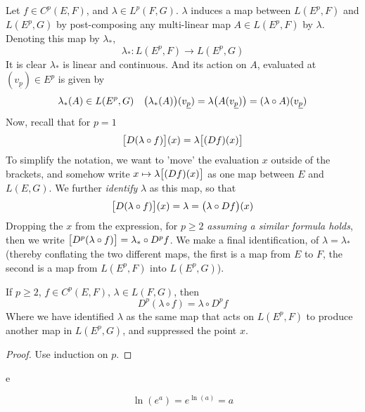 \documentclass[../main-manifolds.tex]{subfiles}
\begin{document}
\begin{note}
    Let $f\in C^p(E,F)$, and $\lambda\in L^p(F,G)$. $\lambda$ induces a map between $L(E^p, F)$ and $L(E^p, G)$ by post-composing any multi-linear map $A\in L(E^p, F)$ by $\lambda$. Denoting this map by $\lambda_*$, 
\[
\lambda_*: L(E^p, F)\to L(E^p, G)
\]
It is clear $\lambda_*$ is linear and continuous. And its action on $A$, evaluated at $(v_{\underline{p}})\in E^p$ is given by
\[
    \lambda_*(A)\in L(E^p, G)\quad \qty\big(\lambda_*(A))(v_{\underline{p}}) = \lambda\qty\big(A(v_{\underline{p}})) = (\lambda\circ A)(v_{\underline{p}})
\]
Now, recall that for $p=1$
\[
    \qty\big[D(\lambda\circ f)](x) = \lambda\qty\big[(Df)(x)]
\]
To simplify the notation, we want to 'move' the evaluation $x$ outside of the brackets, and somehow write $x\mapsto \lambda\qty\big[(Df)(x)]$ as one map between $E$ and $L(E,G)$. We further \emph{identify} $\lambda$ as this map, so that
\[
    \qty\big[D(\lambda\circ f)](x) = \lambda  = \qty\big(\lambda \circ Df)(x)
\]
Dropping the $x$ from the expression, for $p\geq 2$ \emph{assuming a similar formula holds}, then we write $\qty\big[D^p(\lambda\circ f)] = \lambda_*\circ D^pf$. We make a final identification, of $\lambda = \lambda_*$ (thereby conflating the two different maps, the first is a map from $E$ to $F$, the second is a map from $L(E^p, F)$ into $L(E^p, G)$).
\end{note}

\begin{wts}
    If $p\geq 2$, $f\in C^p(E,F)$, $\lambda\in L(F,G)$, then
    \[
        D^p(\lambda\circ f) = \lambda\circ D^pf
    \]
    Where we have identified $\lambda$ as the same map that acts on $L(E^p, F)$ to produce another map in $L(E^p, G)$, and suppressed the point $x$.
\end{wts}
\begin{proof}
    Use induction on $p$.
\end{proof}
\begin{wts}
    e
\end{wts}

\newpage

\[
    \ln(e^{a}) = e^{\ln(a)} = a
\]
\end{document}
